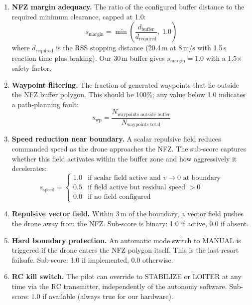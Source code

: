 \documentclass[10pt,a4paper]{article}
\begin{document}
\begin{enumerate}[nosep]
  \item \textbf{NFZ margin adequacy.} The ratio of the configured buffer distance to the required minimum clearance, capped at 1.0:
  \begin{equation}
    s_\text{margin} = \min\!\left(\frac{d_\text{buffer}}{d_\text{required}},\; 1.0\right)
  \end{equation}
  where $d_\text{required}$ is the RSS stopping distance (20.4\,m at 8\,m/s with 1.5\,s reaction time plus braking). Our 30\,m buffer gives $s_\text{margin} = 1.0$ with a 1.5$\times$ safety factor.

  \item \textbf{Waypoint filtering.} The fraction of generated waypoints that lie outside the NFZ buffer polygon. This should be 100\%; any value below 1.0 indicates a path-planning fault:
  \begin{equation}
    s_\text{wp} = \frac{N_\text{waypoints outside buffer}}{N_\text{waypoints total}}
  \end{equation}

  \item \textbf{Speed reduction near boundary.} A scalar repulsive field reduces commanded speed as the drone approaches the NFZ. The sub-score captures whether this field activates within the buffer zone and how aggressively it decelerates:
  \begin{equation}
    s_\text{speed} = \begin{cases} 1.0 & \text{if scalar field active and } v \to 0 \text{ at boundary} \\ 0.5 & \text{if field active but residual speed } > 0 \\ 0.0 & \text{if no field configured} \end{cases}
  \end{equation}

  \item \textbf{Repulsive vector field.} Within 3\,m of the boundary, a vector field pushes the drone away from the NFZ. Sub-score is binary: 1.0 if active, 0.0 if absent.

  \item \textbf{Hard boundary protection.} An automatic mode switch to MANUAL is triggered if the drone enters the NFZ polygon itself. This is the last-resort failsafe. Sub-score: 1.0 if implemented, 0.0 otherwise.

  \item \textbf{RC kill switch.} The pilot can override to STABILIZE or LOITER at any time via the RC transmitter, independently of the autonomy software. Sub-score: 1.0 if available (always true for our hardware).
\end{enumerate}
\end{document}
